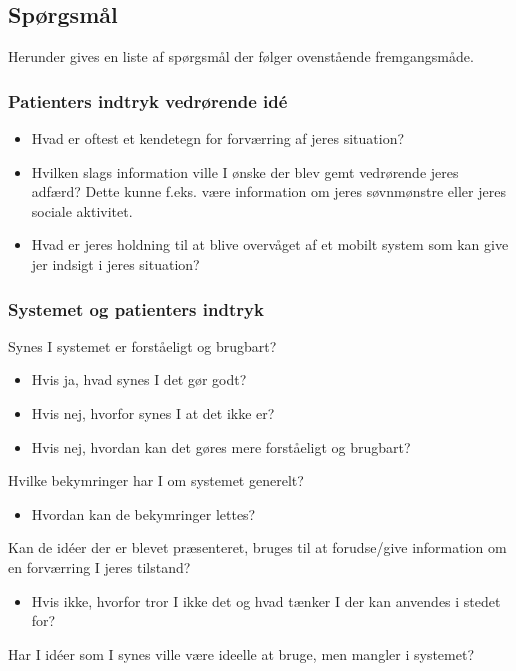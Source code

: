\subsection*{Spørgsmål}
Herunder gives en liste af spørgsmål der følger ovenstående fremgangsmåde.

\subsubsection{Patienters indtryk vedrørende idé}
\begin{itemize}
\item Hvad er oftest et kendetegn for forværring af jeres situation?
\item Hvilken slags information ville I ønske der blev gemt vedrørende jeres adfærd? Dette kunne f.eks. være information om jeres søvnmønstre eller jeres sociale aktivitet.
\item Hvad er jeres holdning til at blive overvåget af et mobilt system som kan give jer indsigt i jeres situation?
\end{itemize}

\subsubsection*{Systemet og patienters indtryk}
\begin{itemize}
\item Synes I systemet er forståeligt og brugbart?
	{\begin{itemize}
	\item Hvis ja, hvad synes I det gør godt?
	\item Hvis nej, hvorfor synes I at det ikke er?
	\item Hvis nej, hvordan kan det gøres mere forståeligt og brugbart?
	\end{itemize}}
\item Hvilke bekymringer har I om systemet generelt?
	{\begin{itemize}
	\item Hvordan kan de bekymringer lettes?
	\end{itemize}}
\item Kan de idéer der er blevet præsenteret, bruges til at forudse/give information om en forværring I jeres tilstand? 
	{\begin{itemize}
	\item Hvis ikke, hvorfor tror I ikke det og hvad tænker I der kan anvendes i stedet for?
	\end{itemize}
\item Har I idéer som I synes ville være ideelle at bruge, men mangler i systemet?}
\end{itemize}
